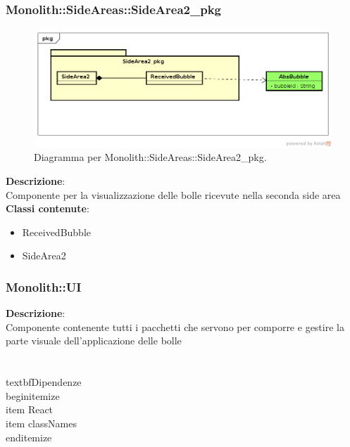 \subsubsection{Monolith::SideAreas::SideArea2\_pkg}
   \FloatBarrier
   \begin{figure}[ht]
   \centering
\includegraphics[width=\textwidth,keepaspectratio]{img/sd2_pkg}
   \caption{Diagramma per Monolith::SideAreas::SideArea2\_pkg.}
\end{figure}
\FloatBarrier
\textbf{Descrizione}:\\
 Componente per la visualizzazione delle bolle ricevute nella seconda side area 
\\ \textbf{Classi contenute}:\\
\begin{itemize}
\item ReceivedBubble
\item SideArea2
\end{itemize}


\clearpage

\subsubsection{Monolith::UI}
\textbf{Descrizione}:\\
 Componente contenente tutti i pacchetti che servono per comporre e gestire la parte visuale dell'applicazione delle bolle \\\\
\\textbf{Dipendenze}
\\begin{itemize}
\\item React
\\item classNames
\\end{itemize} 


\clearpage

